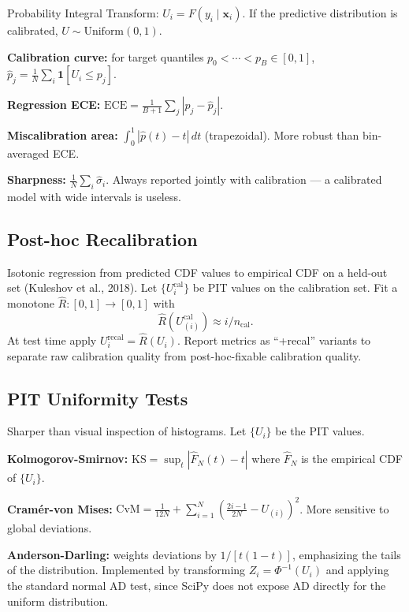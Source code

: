 \documentclass[11pt,a4paper]{article}
\theoremstyle{definition}
\newcommand{\bx}{\mathbf{x}}
\begin{document}
Probability Integral Transform: $U_i = F(y_i \mid \bx_i)$. If the
predictive distribution is calibrated, $U \sim \text{Uniform}(0, 1)$.

\textbf{Calibration curve:} for target quantiles
$p_0 < \cdots < p_B \in [0,1]$,
$\hat{p}_j = \frac{1}{N}\sum_i \mathbf{1}[U_i \leq p_j]$.

\textbf{Regression ECE:} $\text{ECE} = \frac{1}{B+1}\sum_{j} |p_j - \hat{p}_j|$.

\textbf{Miscalibration area:} $\int_0^1 |\hat{p}(t) - t| \, dt$ (trapezoidal).
More robust than bin-averaged ECE.

\textbf{Sharpness:} $\frac{1}{N}\sum_{i} \hat{\sigma}_i$. Always reported
jointly with calibration --- a calibrated model with wide intervals is
useless.

\subsection{Post-hoc Recalibration}
\label{sec:isotonic}

Isotonic regression from predicted CDF values to empirical CDF on a
held-out set (Kuleshov et al., 2018). Let $\{U_i^{\mathrm{cal}}\}$ be PIT
values on the calibration set. Fit a monotone $\hat{R}: [0,1] \to [0,1]$
with
\[
  \hat{R}(U_{(i)}^{\mathrm{cal}}) \approx i / n_{\mathrm{cal}}.
\]
At test time apply $U_i^{\mathrm{recal}} = \hat{R}(U_i)$. Report metrics
as ``+recal'' variants to separate raw calibration quality from
post-hoc-fixable calibration quality.

\subsection{PIT Uniformity Tests}

Sharper than visual inspection of histograms. Let $\{U_i\}$ be the PIT
values.

\textbf{Kolmogorov-Smirnov:} $\text{KS} = \sup_t |\hat{F}_N(t) - t|$
where $\hat{F}_N$ is the empirical CDF of $\{U_i\}$.

\textbf{Cramér-von Mises:}
$\text{CvM} = \tfrac{1}{12N} + \sum_{i=1}^{N}\!\left(\tfrac{2i-1}{2N} - U_{(i)}\right)^2$.
More sensitive to global deviations.

\textbf{Anderson-Darling:} weights deviations by $1/[t(1-t)]$, emphasizing
the tails of the distribution. Implemented by transforming
$Z_i = \Phi^{-1}(U_i)$ and applying the standard normal AD test, since
SciPy does not expose AD directly for the uniform distribution.
\end{document}
